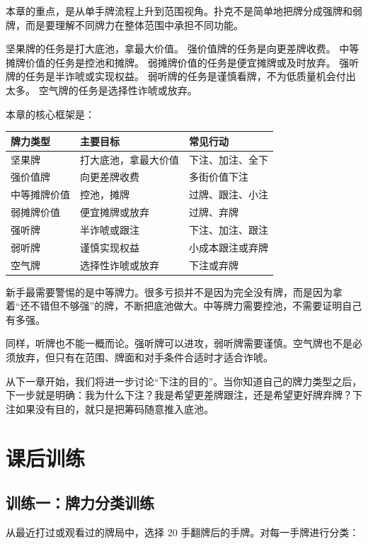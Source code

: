 本章的重点，是从单手牌流程上升到范围视角。扑克不是简单地把牌分成强牌和弱牌，而是要理解不同牌力在整体范围中承担不同功能。

坚果牌的任务是打大底池，拿最大价值。
强价值牌的任务是向更差牌收费。
中等摊牌价值的任务是控池和摊牌。
弱摊牌价值的任务是便宜摊牌或及时放弃。
强听牌的任务是半诈唬或实现权益。
弱听牌的任务是谨慎看牌，不为低质量机会付出太多。
空气牌的任务是选择性诈唬或放弃。

本章的核心框架是：

\begin{center}
\begin{tabular}{lll}
\toprule
\textbf{牌力类型} & \textbf{主要目标} & \textbf{常见行动} \\
\midrule
坚果牌 & 打大底池，拿最大价值 & 下注、加注、全下 \\
强价值牌 & 向更差牌收费 & 多街价值下注 \\
中等摊牌价值 & 控池，摊牌 & 过牌、跟注、小注 \\
弱摊牌价值 & 便宜摊牌或放弃 & 过牌、弃牌 \\
强听牌 & 半诈唬或跟注 & 下注、加注、跟注 \\
弱听牌 & 谨慎实现权益 & 小成本跟注或弃牌 \\
空气牌 & 选择性诈唬或放弃 & 下注或弃牌 \\
\bottomrule
\end{tabular}
\end{center}

新手最需要警惕的是中等牌力。很多亏损并不是因为完全没有牌，而是因为拿着“还不错但不够强”的牌，不断把底池做大。中等牌力需要控池，不需要证明自己有多强。

同样，听牌也不能一概而论。强听牌可以进攻，弱听牌需要谨慎。空气牌也不是必须放弃，但只有在范围、牌面和对手条件合适时才适合诈唬。

从下一章开始，我们将进一步讨论“下注的目的”。当你知道自己的牌力类型之后，下一步就是明确：我为什么下注？我是希望更差牌跟注，还是希望更好牌弃牌？下注如果没有目的，就只是把筹码随意推入底池。

\section{课后训练}

\subsection*{训练一：牌力分类训练}

从最近打过或观看过的牌局中，选择 20 手翻牌后的手牌。对每一手牌进行分类：


